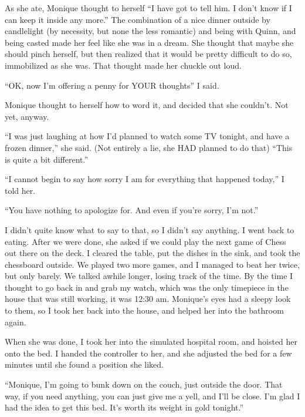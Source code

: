 \begin{thought}
As she ate, Monique thought to herself ``I have got to tell him. I don't know if I can keep
it inside any more.'' The combination of a nice dinner outside by candlelight (by necessity, but
none the less romantic) and being with Quinn, and being casted made her feel like she was in a
dream. She thought that maybe she should pinch herself, but then realized that it would be
pretty difficult to do so, immobilized as she was. That thought made her chuckle out loud.
\end{thought}

``OK, now I'm offering a penny for YOUR thoughts'' I said.

\begin{thought}
Monique thought to herself how to word it, and decided that she couldn't. Not yet, anyway.
\end{thought}

``I was just laughing at how I'd planned to watch some TV tonight, and have a frozen
dinner,'' she said. (Not entirely a lie, she HAD planned to do that) ``This is quite a bit
different.''

``I cannot begin to say how sorry I am for everything that happened today,'' I told her.

``You have nothing to apologize for. And even if you're sorry, I'm not.''

I didn't quite know what to say to that, so I didn't say anything. I went back to eating.
After we were done, she asked if we could play the next game of Chess out there on the deck. I
cleared the table, put the dishes in the sink, and took the chessboard outside. We played two
more games, and I managed to beat her twice, but only barely. We talked awhile longer, losing
track of the time. By the time I thought to go back in and grab my watch, which was the only
timepiece in the house that was still working, it was 12:30 am. Monique's eyes had a sleepy look
to them, so I took her back into the house, and helped her into the bathroom again.

When she was done, I took her into the simulated hospital room, and hoisted her onto the
bed. I handed the controller to her, and she adjusted the bed for a few minutes until she found
a position she liked.

``Monique, I'm going to bunk down on the couch, just outside the door. That way, if you
need anything, you can just give me a yell, and I'll be close. I'm glad I had the idea to get
this bed. It's worth its weight in gold tonight.''

